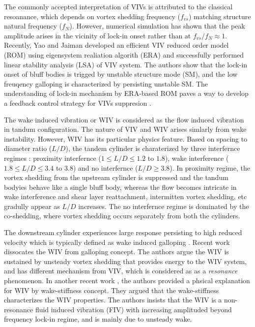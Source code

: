 The commonly accepted interpretation of VIVs is attributed to the classical resoanance, which depends on 
vortex shedding frequency ($f_{vs}$) matching structure natural frequency ($f_N$). However, numerical simulation has shown that 
the peak amplitude arises in the vicinity of lock-in onset rather than at $f_{vs}/f_N \approx 1$. Recently, Yao and Jaiman \cite{yao_jfm_1} 
developed an efficient VIV reduced order model (ROM) using eigensystem realiation algorith (ERA) and successfully performed
linear stability analysis (LSA) of VIV system. 
The authors show that the lock-in onset of bluff bodies is trigged by unstable structure mode (SM), and 
the low freuqency galloping is characterized by persisting unstable SM. The understanding of lock-in mechanism by ERA-based ROM 
paves a way to develop a feedback control strategy for VIVs suppresion \cite{yao_jfm_2}. 


The wake induced vibration or WIV is considered as the flow induced vibration in tandum 
configuration. The nature of VIV and WIV arises simlarly from wake instability. However, WIV has its particular physics 
feature. Based on spacing to diameter ratio ($L/D$), the tandem cylinder is charaterized by 
three interfernce regimes \cite{Mysa2016,ZDRAVKOVICH1987239,1981323}: proximity interfernce ($1 \le L/D \le 1.2$ to $1.8$), 
wake interference ($1.8 \le L/D \le 3.4$ to $3.8$) and no interfernce ($L/D \ge 3.8$).
In proximity regime, the vortex shedding
from the upstream cylinder is suppressed and the tandum bodyies behave like a single bluff body, whereas the flow becomes intricate 
in wake interference and shear layer reattachment, intermitten vortex shedding, etc gradully appear as $L/D$ increases. 
The no interfernce regime is dominated by the co-shedding, where vortex shedding occurs separately from both the cylinders.


The downstream cylinder experiences large response persisting to high reduced velocity 
which is typically defined as wake induced galloping \cite{bokaian1984}. Recent work 
\cite{assi2010} dissocates the WIV from galloping concept. The authors argue the WIV is 
sustained by unsteady vortex shedding that provides energy to the WIV system, 
and has different mechanism from VIV, which is considered as 
as a \textit{resonance} phenomenon. In another recent work \cite{assi2013}, the authors provided a 
phsical explanation for WIV by wake-stiffness concept. They argued that the wake-stiffness characterizes the 
WIV properties. The authors \cite{assi2010,assi2013} insists that the WIV is a non-resonance 
fluid induced vibration (FIV) with increasing amplituded beyond frequency lock-in regime, and is mainly due to 
unsteady wake. 

